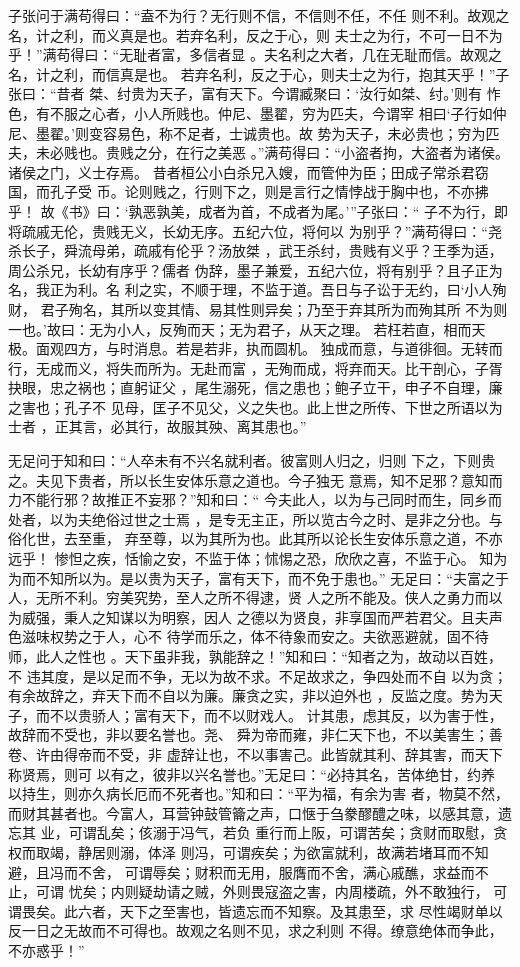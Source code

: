 \documentclass[12pt,UTF8]{ctexbook}
\begin{document}
子张问于满苟得曰：“盍不为行？无行则不信，不信则不任，不任 则不利。故观之名，计之利，而义真是也。若弃名利，反之于心，则 夫士之为行，不可一日不为乎！”满苟得曰：“无耻者富，多信者显 。夫名利之大者，几在无耻而信。故观之名，计之利，而信真是也。 若弃名利，反之于心，则夫士之为行，抱其天乎！”子张曰：“昔者 桀、纣贵为天子，富有天下。今谓臧聚曰：‘汝行如桀、纣。’则有 怍色，有不服之心者，小人所贱也。仲尼、墨翟，穷为匹夫，今谓宰 相曰‘子行如仲尼、墨翟。’则变容易色，称不足者，士诚贵也。故 势为天子，未必贵也；穷为匹夫，未必贱也。贵贱之分，在行之美恶 。”满苟得曰：“小盗者拘，大盗者为诸侯。诸侯之门，义士存焉。 昔者桓公小白杀兄入嫂，而管仲为臣；田成子常杀君窃国，而孔子受 币。论则贱之，行则下之，则是言行之情悖战于胸中也，不亦拂乎！ 故《书》曰：‘孰恶孰美，成者为首，不成者为尾。’”子张曰：“ 子不为行，即将疏戚无伦，贵贱无义，长幼无序。五纪六位，将何以 为别乎？”满苟得曰：“尧杀长子，舜流母弟，疏戚有伦乎？汤放桀 ，武王杀纣，贵贱有义乎？王季为适，周公杀兄，长幼有序乎？儒者 伪辞，墨子兼爱，五纪六位，将有别乎？且子正为名，我正为利。名 利之实，不顺于理，不监于道。吾日与子讼于无约，曰‘小人殉财， 君子殉名，其所以变其情、易其性则异矣；乃至于弃其所为而殉其所 不为则一也。’故曰：无为小人，反殉而天；无为君子，从天之理。 若枉若直，相而天极。面观四方，与时消息。若是若非，执而圆机。 独成而意，与道徘徊。无转而行，无成而义，将失而所为。无赴而富 ，无殉而成，将弃而天。比干剖心，子胥抉眼，忠之祸也；直躬证父 ，尾生溺死，信之患也；鲍子立干，申子不自理，廉之害也；孔子不 见母，匡子不见父，义之失也。此上世之所传、下世之所语以为士者 ，正其言，必其行，故服其殃、离其患也。”

无足问于知和曰：“人卒未有不兴名就利者。彼富则人归之，归则 下之，下则贵之。夫见下贵者，所以长生安体乐意之道也。今子独无 意焉，知不足邪？意知而力不能行邪？故推正不妄邪？”知和曰：“ 今夫此人，以为与己同时而生，同乡而处者，以为夫绝俗过世之士焉 ，是专无主正，所以览古今之时、是非之分也。与俗化世，去至重， 弃至尊，以为其所为也。此其所以论长生安体乐意之道，不亦远乎！ 惨怛之疾，恬愉之安，不监于体；怵惕之恐，欣欣之喜，不监于心。 知为为而不知所以为。是以贵为天子，富有天下，而不免于患也。” 无足曰：“夫富之于人，无所不利。穷美究势，至人之所不得逮，贤 人之所不能及。侠人之勇力而以为威强，秉人之知谋以为明察，因人 之德以为贤良，非享国而严若君父。且夫声色滋味权势之于人，心不 待学而乐之，体不待象而安之。夫欲恶避就，固不待师，此人之性也 。天下虽非我，孰能辞之！”知和曰：“知者之为，故动以百姓，不 违其度，是以足而不争，无以为故不求。不足故求之，争四处而不自 以为贪；有余故辞之，弃天下而不自以为廉。廉贪之实，非以迫外也 ，反监之度。势为天子，而不以贵骄人；富有天下，而不以财戏人。 计其患，虑其反，以为害于性，故辞而不受也，非以要名誉也。尧、 舜为帝而雍，非仁天下也，不以美害生；善卷、许由得帝而不受，非 虚辞让也，不以事害己。此皆就其利、辞其害，而天下称贤焉，则可 以有之，彼非以兴名誉也。”无足曰：“必持其名，苦体绝甘，约养 以持生，则亦久病长厄而不死者也。”知和曰：“平为福，有余为害 者，物莫不然，而财其甚者也。今富人，耳营钟鼓管籥之声，口惬于刍豢醪醴之味，以感其意，遗忘其 业，可谓乱矣；侅溺于冯气，若负 重行而上阪，可谓苦矣；贪财而取慰，贪权而取竭，静居则溺，体泽 则冯，可谓疾矣；为欲富就利，故满若堵耳而不知避，且冯而不舍， 可谓辱矣；财积而无用，服膺而不舍，满心戚醮，求益而不止，可谓 忧矣；内则疑劫请之贼，外则畏寇盗之害，内周楼疏，外不敢独行， 可谓畏矣。此六者，天下之至害也，皆遗忘而不知察。及其患至，求 尽性竭财单以反一日之无故而不可得也。故观之名则不见，求之利则 不得。缭意绝体而争此，不亦惑乎！”
\end{document}
